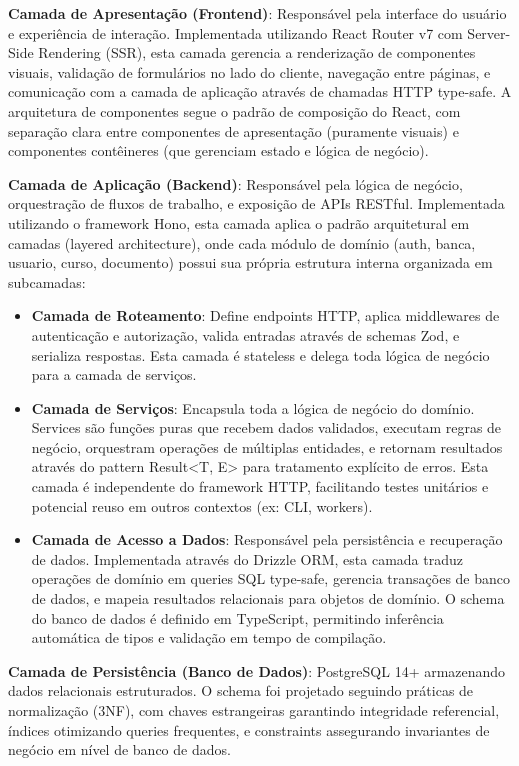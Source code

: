 \documentclass[nonacm, sigconf]{acmart}
\begin{document}
\textbf{Camada de Apresentação (Frontend)}: Responsável pela interface do usuário e experiência de interação. Implementada utilizando React Router v7 com Server-Side Rendering (SSR), esta camada gerencia a renderização de componentes visuais, validação de formulários no lado do cliente, navegação entre páginas, e comunicação com a camada de aplicação através de chamadas HTTP type-safe. A arquitetura de componentes segue o padrão de composição do React, com separação clara entre componentes de apresentação (puramente visuais) e componentes contêineres (que gerenciam estado e lógica de negócio).

\textbf{Camada de Aplicação (Backend)}: Responsável pela lógica de negócio, orquestração de fluxos de trabalho, e exposição de APIs RESTful. Implementada utilizando o framework Hono, esta camada aplica o padrão arquitetural em camadas (layered architecture), onde cada módulo de domínio (auth, banca, usuario, curso, documento) possui sua própria estrutura interna organizada em subcamadas:

\begin{itemize}
\item \textbf{Camada de Roteamento}: Define endpoints HTTP, aplica middlewares de autenticação e autorização, valida entradas através de schemas Zod, e serializa respostas. Esta camada é stateless e delega toda lógica de negócio para a camada de serviços.

\item \textbf{Camada de Serviços}: Encapsula toda a lógica de negócio do domínio. Services são funções puras que recebem dados validados, executam regras de negócio, orquestram operações de múltiplas entidades, e retornam resultados através do pattern Result<T, E> para tratamento explícito de erros. Esta camada é independente do framework HTTP, facilitando testes unitários e potencial reuso em outros contextos (ex: CLI, workers).

\item \textbf{Camada de Acesso a Dados}: Responsável pela persistência e recuperação de dados. Implementada através do Drizzle ORM, esta camada traduz operações de domínio em queries SQL type-safe, gerencia transações de banco de dados, e mapeia resultados relacionais para objetos de domínio. O schema do banco de dados é definido em TypeScript, permitindo inferência automática de tipos e validação em tempo de compilação.
\end{itemize}

\textbf{Camada de Persistência (Banco de Dados)}: PostgreSQL 14+ armazenando dados relacionais estruturados. O schema foi projetado seguindo práticas de normalização (3NF), com chaves estrangeiras garantindo integridade referencial, índices otimizando queries frequentes, e constraints assegurando invariantes de negócio em nível de banco de dados.
\end{document}
